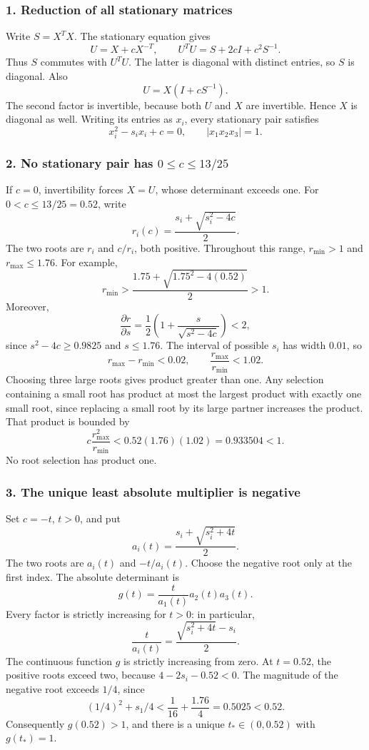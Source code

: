 \documentclass[10pt,a4paper]{article}
\begin{document}
\subsubsection{1. Reduction of all stationary
matrices}\label{reduction-of-all-stationary-matrices}

Write \(S=X^TX\). The stationary equation gives \[
U=X+cX^{-T},\qquad U^TU=S+2cI+c^2S^{-1}.
\] Thus \(S\) commutes with \(U^TU\). The latter is diagonal with
distinct entries, so \(S\) is diagonal. Also \[
U=X(I+cS^{-1}).
\] The second factor is invertible, because both \(U\) and \(X\) are
invertible. Hence \(X\) is diagonal as well. Writing its entries as
\(x_i\), every stationary pair satisfies \[
x_i^2-s_ix_i+c=0,\qquad |x_1x_2x_3|=1.
\]

\subsubsection{\texorpdfstring{2. No stationary pair has
\(0\le c\le13/25\)}{2. No stationary pair has 0\textbackslash le c\textbackslash le13/25}}\label{no-stationary-pair-has-0le-cle1325}

If \(c=0\), invertibility forces \(X=U\), whose determinant exceeds one.
For \(0<c\le13/25=0.52\), write \[
r_i(c)=\frac{s_i+\sqrt{s_i^2-4c}}2.
\] The two roots are \(r_i\) and \(c/r_i\), both positive. Throughout
this range, \(r_{\min}>1\) and \(r_{\max}\le1.76\). For example, \[
r_{\min}>\frac{1.75+\sqrt{1.75^2-4(0.52)}}2>1.
\] Moreover, \[
\frac{\partial r}{\partial s}
=\frac12\left(1+\frac{s}{\sqrt{s^2-4c}}\right)<2,
\] since \(s^2-4c\ge0.9825\) and \(s\le1.76\). The interval of possible
\(s_i\) has width \(0.01\), so \[
r_{\max}-r_{\min}<0.02,\qquad
\frac{r_{\max}}{r_{\min}}<1.02.
\] Choosing three large roots gives product greater than one. Any
selection containing a small root has product at most the largest
product with exactly one small root, since replacing a small root by its
large partner increases the product. That product is bounded by \[
c\frac{r_{\max}^2}{r_{\min}}
<0.52(1.76)(1.02)=0.933504<1.
\] No root selection has product one.

\subsubsection{3. The unique least absolute multiplier is
negative}\label{the-unique-least-absolute-multiplier-is-negative}

Set \(c=-t\), \(t>0\), and put \[
a_i(t)=\frac{s_i+\sqrt{s_i^2+4t}}2.
\] The two roots are \(a_i(t)\) and \(-t/a_i(t)\). Choose the negative
root only at the first index. The absolute determinant is \[
g(t)=\frac{t}{a_1(t)}a_2(t)a_3(t).
\] Every factor is strictly increasing for \(t>0\): in particular, \[
\frac{t}{a_i(t)}=\frac{\sqrt{s_i^2+4t}-s_i}{2}.
\] The continuous function \(g\) is strictly increasing from zero. At
\(t=0.52\), the positive roots exceed two, because \(4-2s_i-0.52<0\).
The magnitude of the negative root exceeds \(1/4\), since \[
(1/4)^2+s_1/4<\frac1{16}+\frac{1.76}{4}=0.5025<0.52.
\] Consequently \(g(0.52)>1\), and there is a unique \(t_*\in(0,0.52)\)
with \(g(t_*)=1\).
\end{document}
